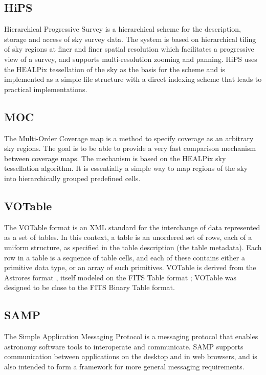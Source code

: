 \documentclass[11pt,a4paper]{ivoa}
\begin{document}
\subsection{HiPS}

Hierarchical Progressive Survey is a hierarchical scheme for the description, storage and 
access of sky survey data. The system is based on hierarchical tiling of sky regions at 
finer and finer spatial resolution which facilitates a progressive view of a survey, and 
supports multi-resolution zooming and panning. HiPS uses the HEALPix tessellation of the 
sky as the basis for the scheme and is implemented as a simple file structure with a direct 
indexing scheme that leads to practical implementations. 

\subsection{MOC}

The Multi-Order Coverage map is a method to specify coverage as an arbitrary sky regions. 
The goal is to be able to provide a very fast comparison mechanism between coverage maps. 
The mechanism is based on the HEALPix sky tessellation algorithm. It is essentially a 
simple way to map regions of the sky into hierarchically grouped predefined cells. 

\subsection{VOTable} 

The VOTable format is an XML standard for the interchange of data represented as a set of tables. 
In this context, a table is an unordered set of rows, each of a uniform structure, as specified 
in the table description (the table metadata). Each row in a table is a sequence of table cells, 
and each of these contains either a primitive data type, or an array of such primitives. VOTable 
is derived from the Astrores format \citep{astrores}, itself modeled on the FITS Table format 
\citep{std:FITS}; VOTable was designed to be close to the FITS Binary Table format. 

\subsection{SAMP}

The Simple Application Messaging Protocol is a messaging protocol that enables astronomy 
software tools to interoperate and communicate. SAMP supports communication between 
applications on the desktop and in web browsers, and is also intended to form a framework 
for more general messaging requirements. 
\end{document}
